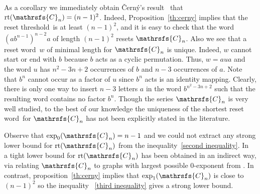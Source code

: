 \documentclass[11pt]{llncs}
\newcommand{\sw}{reset word}
\newcommand{\reth}{reset threshold}
\DeclareMathOperator{\rt}{rt}
\begin{document}
As a corollary we immediately obtain \v{C}ern\'{y}'s
result~\cite[Lemma~1]{Ce64} that $\rt(\mathrsfs{C}_n)=(n - 1)^2$. Indeed,
Proposition~\ref{th:cerny} implies that the \reth\ is at least $(n - 1)^2$, and
it is easy to check that the word $(ab^{n - 1})^{n - 2}a$ of length $(n - 1)^2$
resets $\mathrsfs{C}_n$. Also we see that a \sw\ $w$ of minimal length for
$\mathrsfs{C}_n$ is unique. Indeed, $w$ cannot start or end with $b$ because
$b$ acts as a cyclic permutation. Thus, $w = aua$ and the word $u$ has $n^2 -
3n + 2$ occurrences of $b$ and $n - 3$ occurrences of $a$. Note that $b^n$
cannot occur as a factor of $u$ since $b^n$ acts is an identity mapping.
Clearly, there is only one way to insert $n - 3$ letters $a$ in the word
$b^{n^2-3n+2}$ such that the resulting word contains no factor $b^n$. Though
the series $\mathrsfs{C}_n$ is very well studied, to the best of our knowledge
the uniqueness of the shortest \sw\ for $\mathrsfs{C}_n$ has not been
explicitly stated in the literature.

Observe that $\exp_0(\mathrsfs{C}_n)=n-1$ and we could not extract any strong
lower bound for $\rt(\mathrsfs{C}_n)$ from the inequality~\eqref{second
inequality}. In~\cite{AGV} a tight lower bound for $\rt(\mathrsfs{C}_n)$ has
been obtained in an indirect way, via relating $\mathrsfs{C}_n$ to graphs with
largest possible 0-exponent from \cite{Wi50}. In contrast, proposition~\ref{th:cerny}
implies that $\exp_1(\mathrsfs{C}_n)$ is close to $(n-1)^2$ so the inequality
~\eqref{third inequality} gives a strong lower bound.


\end{document}
